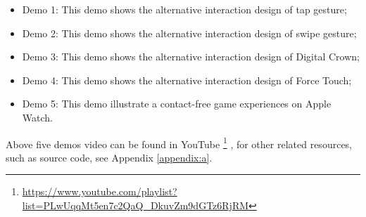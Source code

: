 \begin{itemize}
    \kaishu
    \item Demo 1: This demo shows the alternative interaction design of tap gesture;
    \item Demo 2: This demo shows the alternative interaction design of swipe gesture;
    \item Demo 3: This demo shows the alternative interaction design of Digital Crown;
    \item Demo 4: This demo shows the alternative interaction design of Force Touch;
    \item Demo 5: This demo illustrate a contact-free game experiences on Apple Watch.
\end{itemize}

Above five demos video can be found in YouTube
\footnote{\url{https://www.youtube.com/playlist?list=PLwUqqMt5en7c2QaQ_DkuvZm9dGTz6RjRM}}
, for other related resources, such as source code, see Appendix \ref{appendix:a}.

\cleardoublepage
